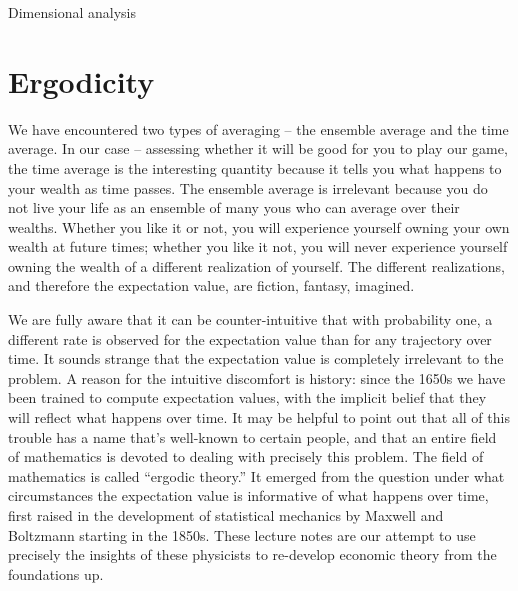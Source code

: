 \begin{excursion}{Dimensional analysis}
%
\end{excursion}

\section{Ergodicity}

We have encountered two types of averaging -- the ensemble average and the
time average. In our case -- assessing whether it will be good for you to play our 
game, the time average is the interesting quantity because it tells you what happens
to your wealth as time passes. The ensemble average is irrelevant 
because you do not live your life as an ensemble of many yous who can average
over their wealths. Whether you like it or not, you will experience yourself owning 
your own wealth at future times; whether you like it not, you will never experience
yourself owning the wealth of a different realization of yourself. The different realizations,
and therefore the expectation value, are fiction, fantasy, imagined.

We are fully aware that it can be counter-intuitive that with probability one, a different
rate is observed for the expectation value than for any trajectory over time. It sounds
strange that the expectation value is completely irrelevant to the problem. A reason
for the intuitive discomfort is history: since the 1650s we have been trained to
compute expectation values, with the implicit belief that they will reflect what happens
over time. It may be helpful to point out that all of this trouble has a name that's well-known
to certain people, and that an entire field of mathematics is devoted to dealing with
precisely this problem. The field of mathematics is called ``ergodic theory.'' It emerged
from the question under what circumstances the expectation value is informative 
of what happens over time, first raised in the development of statistical mechanics by Maxwell and 
Boltzmann starting in the 1850s. These lecture notes are our attempt to use precisely the insights of these physicists to re-develop economic theory from the foundations up.

